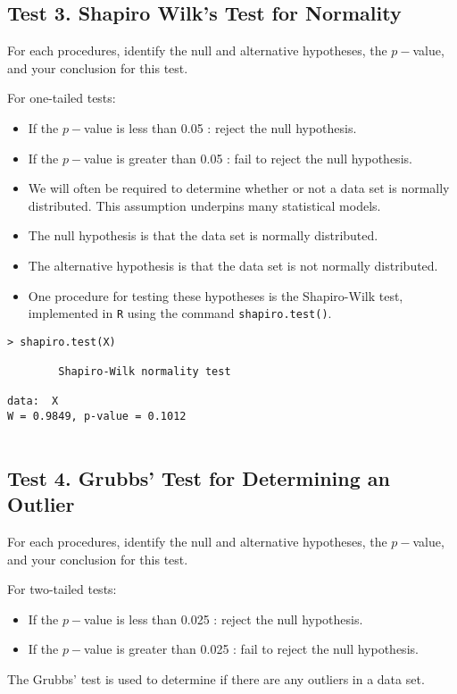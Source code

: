 \documentclass[a4paper,12pt]{article}
\begin{document}
\subsection*{Test 3. Shapiro Wilk's Test for Normality}

\begin{framed}
For each procedures, identify the null and alternative hypotheses, the $p-$value, and your conclusion for this test.

\noindent For one-tailed tests:
\begin{itemize}
\item If the $p-$value is less than 0.05 : reject the null hypothesis.
\item If the $p-$value is greater than 0.05 : fail to reject the null hypothesis.
\end{itemize}
\end{framed}

\begin{itemize}
\item We will often be required to determine whether or not a data set is normally distributed.
This assumption underpins many statistical models.
\item The null hypothesis is that the data set is normally distributed.
\item The alternative hypothesis is that the data set is not normally distributed.
\item One procedure for testing these hypotheses is the Shapiro-Wilk test, implemented in \texttt{R} using the command \texttt{shapiro.test()}.
\end{itemize}
\begin{framed}
\begin{verbatim}
> shapiro.test(X)

        Shapiro-Wilk normality test

data:  X
W = 0.9849, p-value = 0.1012


\end{verbatim}
\end{framed}
\subsection*{Test 4. Grubbs' Test for Determining an Outlier}

\begin{framed}
For each procedures, identify the null and alternative hypotheses, the $p-$value, and your conclusion for this test.

\noindent For two-tailed tests:
\begin{itemize}
\item If the $p-$value is less than 0.025 : reject the null hypothesis.
\item If the $p-$value is greater than 0.025 : fail to reject the null hypothesis.
\end{itemize}
\end{framed}
The Grubbs' test is used to determine if there are any outliers in a data set.\\ \bigskip
\end{document}
